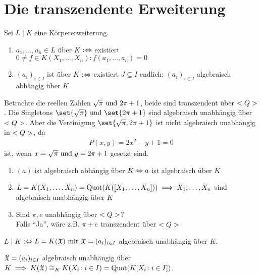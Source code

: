 \section{Die transzendente Erweiterung}
Sei $L\mid K$ eine Körpererweiterung.
\begin{definition}
	\begin{enumerate}[label=(\alph*)]
		\item $a_1, \dots, a_n \in L$  über $K$ $: \Leftrightarrow $ existiert \\$0 \neq f \in K(X_1,\dots, X_n) \colon f(a_1, \dots, a_n) = 0$
		\item $(a_i)_{i\in I}$ ist  über $K$ $:\Leftrightarrow$ existiert $J \subseteq I$ endlich: $(a_i)_{i\in I}$ algebraisch abhängig über $K$
	\end{enumerate}
\end{definition}
\begin{*example}
	Betrachte die reellen Zahlen $\sqrt{\pi} \text{ und } 2\pi +1$, beide sind transzendent über $<Q>$. Die Singletons $\set{\sqrt{\pi}}\und \set{2\pi +1}$ sind algebraisch unabhängig über $<Q>$. Aber die Vereinigung $\set{\sqrt{\pi}, 2\pi +1}$ ist nicht algebraisch unabhängig in $<Q>$, da
	\begin{align*}
		P(x,y) = 2x^2 - y + 1 = 0
	\end{align*}
	ist, wenn $x = \sqrt{\pi} \text{ und } y = 2\pi +1$ gesetzt sind.
\end{*example}
\begin{remark}
	\begin{enumerate}[label=(\alph*)]
		\item $(a)$ ist algebraisch abhängig über $K \Leftrightarrow a$ ist algebraisch über $K$
		\item $L = K(X_1,\dots, X_n) = \operatorname{Quot}(K([X_1,\dots, X_n])) \implies X_1,\dots, X_n$ sind algebraisch unabhängig über $K$
		\item Sind $\pi, e$ unabhängig über $<Q>$?\\
		Falls ``Ja'', wäre z.B. $\pi+e$ transzendent über $<Q>$
	\end{enumerate}
\end{remark}
\begin{definition}
	$L \mid K$  $:\Leftrightarrow L = K(\mathfrak{X}) \text{ mit } \mathfrak{X} = (a_i)_{i\in I}$ algebraisch unabhängig über $K$.
\end{definition}
\begin{lemma}
	$\mathfrak{X} = (a_i)_{i \in I}$ algebraisch unabhängig über $K \implies K(\mathfrak{X}) \cong_K K(X_i \colon i \in I) = \operatorname{Quot}(K[X_i \colon i \in I])$. 
\end{lemma}
